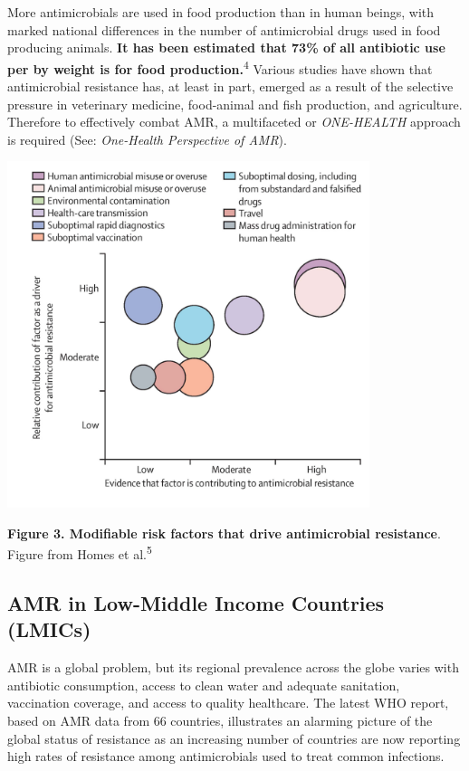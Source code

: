 \documentclass[
  11pt,
  paper=a4,
  ,captions=tableheading
]{scrartcl}
\begin{document}
More antimicrobials are used in food production than in human beings,
with marked national differences in the number of antimicrobial drugs
used in food producing animals. \textbf{It has been estimated that 73\%
of all antibiotic use per by weight is for food
production.}\textsuperscript{4} Various studies have shown that
antimicrobial resistance has, at least in part, emerged as a result of
the selective pressure in veterinary medicine, food-animal and fish
production, and agriculture. Therefore to effectively combat AMR, a
multifaceted or \emph{ONE-HEALTH} approach is required (See:
\emph{One-Health Perspective of AMR}).

\includegraphics[width=4.16667in,height=\textheight]{images/modifiablerisk.png}

\textbf{Figure 3. Modifiable risk factors that drive antimicrobial
resistance}. Figure from Homes et al.\textsuperscript{5}

\hypertarget{amr-in-low-middle-income-countries-lmics}{%
\subsection*{AMR in Low-Middle Income Countries
(LMICs)}\label{amr-in-low-middle-income-countries-lmics}}

AMR is a global problem, but its regional prevalence across the globe
varies with antibiotic consumption, access to clean water and adequate
sanitation, vaccination coverage, and access to quality healthcare. The
latest WHO report, based on AMR data from 66 countries, illustrates an
alarming picture of the global status of resistance as an increasing
number of countries are now reporting high rates of resistance among
antimicrobials used to treat common infections.
\end{document}
